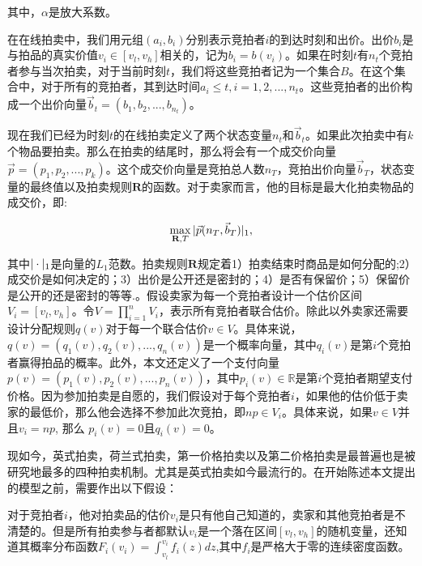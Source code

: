 其中，$\alpha$是放大系数。

在在线拍卖中，我们用元组$(a_i,b_i)$分别表示竞拍者$i$的到达时刻和出价。出价$b_i$是与拍品的真实价值$v_i \in [v_l,v_h]$相关的，记为$b_i=b(v_i)$。如果在时刻$t$有$n_t$个竞拍者参与当次拍卖，对于当前时刻$t$，我们将这些竞拍者记为一个集合$B$。在这个集合中，对于所有的竞拍者，其到达时间$a_i \le t, i=1,2,...,n_t$。这些竞拍者的出价构成一个出价向量$\vec{b}_t=(b_1,b_2,...,b_{n_t})$。

现在我们已经为时刻$t$的在线拍卖定义了两个状态变量$n_t$和$\vec{b}_t$。如果此次拍卖中有$k$个物品要拍卖。那么在拍卖的结尾时，那么将会有一个成交价向量$\vec{p}=(p_1,p_2,...,p_k)$。这个成交价向量是竞拍总人数$n_T$，竞拍出价向量$\vec{b}_T$，状态变量的最终值以及拍卖规则$\textbf{R}$的函数。对于卖家而言，他的目标是最大化拍卖物品的成交价，即:

\begin{equation}
\max_{\textbf{R},T} \arrowvert \vec{p}(n_T,\vec{b}_T) \arrowvert_1,
\end{equation}

其中$\arrowvert\cdot\arrowvert_1$是向量的$L_1$范数。拍卖规则$\textbf{R}$规定着1）拍卖结束时商品是如何分配的;2）成交价是如何决定的；3）出价是公开还是密封的；4）是否有保留价；5）保留价是公开的还是密封的等等\cite{Pinker2003Managing}.。假设卖家为每一个竞拍者设计一个估价区间$V_i=[v_l,v_h]$。令$V=\prod_{i=1}^{n}V_i$，表示所有竞拍者联合估价。除此以外卖家还需要设计分配规则$q(v)$对于每一个联合估价$v \in V$。具体来说，$q(v)=(q_1(v),q_2(v),...,q_n(v))$是一个概率向量，其中$q_i(v)$是第$i$个竞拍者赢得拍品的概率。此外，本文还定义了一个支付向量$p(v)=(p_1(v),p_2(v),...,p_n(v))$，其中$p_i(v)\in \mathbb{R}$是第$i$个竞拍者期望支付价格。因为参加拍卖是自愿的，我们假设对于每个竞拍者$i$，如果他的估价低于卖家的最低价，那么他会选择不参加此次竞拍，即$np \in V_i$。具体来说，如果$v\in V$并且$v_i=np$, 那么 $p_i(v)=0$且$q_i(v)=0$。

现如今，英式拍卖，荷兰式拍卖，第一价格拍卖以及第二价格拍卖是最普遍也是被研究地最多的四种拍卖机制。尤其是英式拍卖如今最流行的。在开始陈述本文提出的模型之前，需要作出以下假设：

\begin{assmp}[个人估价私密性]
\label{conj:private value}
  对于竞拍者$i$，他对拍卖品的估价$v_i$是只有他自己知道的，卖家和其他竞拍者是不清楚的。但是所有拍卖参与者都默认$v_i$是一个落在区间$[v_l,v_h]$的随机变量，还知道其概率分布函数$F_i(v_i)=\int_{v_l}^{v_i}f_i(z)dz$,其中$f_i$是严格大于零的连续密度函数。
 
\end{assmp}

